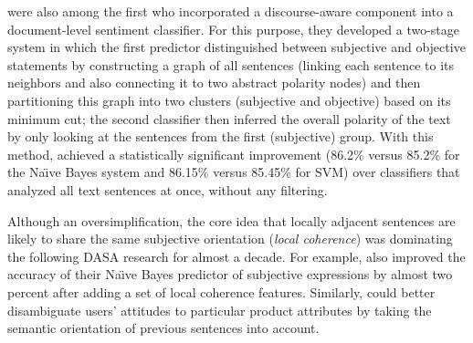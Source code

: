  were also among the first who incorporated a
discourse-aware component into a document-level sentiment classifier.
For this purpose, they developed a two-stage system in which the first
predictor distinguished between subjective and objective statements by
constructing a graph of all sentences (linking each sentence to its
neighbors and also connecting it to two abstract polarity nodes) and
then partitioning this graph into two clusters (subjective and
objective) based on its minimum cut; the second classifier then
inferred the overall polarity of the text by only looking at the
sentences from the first (subjective) group.  With this method,
 achieved a statistically significant improvement
(86.2\% versus 85.2\% for the Na\"{\i}ve Bayes system and 86.15\%
versus 85.45\% for SVM) over classifiers that analyzed all text
sentences at once, without any filtering.

Although an oversimplification, the core idea that locally adjacent
sentences are likely to share the same subjective orientation
(\emph{local coherence}) was dominating the following DASA research
for almost a decade.  For example,  also improved the
accuracy of their Na\"{\i}ve Bayes predictor of subjective expressions
by almost two percent after adding a set of local coherence features.
Similarly,  could better disambiguate users' attitudes to
particular product attributes by taking the semantic orientation of
previous sentences into account.

